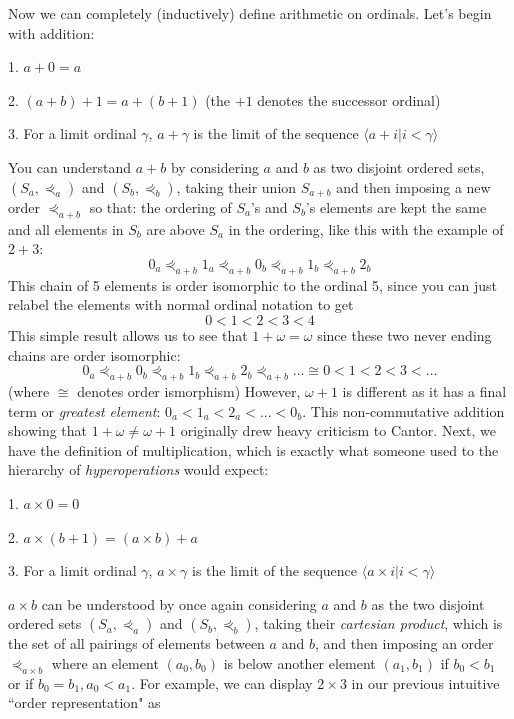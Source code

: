 Now we can completely (inductively) define arithmetic on ordinals. Let's begin with addition:

1. \(a + 0 = a\)

2. \((a+b)+1 = a+(b+1)\) (the \(+1\) denotes the successor ordinal)

3. For a limit ordinal \(\gamma\), \(a+\gamma\) is the limit of the sequence \(\langle a+i | i < \gamma \rangle\)

You can understand \(a+b\) by considering \(a\) and \(b\) as two disjoint ordered sets, \((S_a,\curlyeqprec_a)\) and \((S_b,\curlyeqprec_b)\), taking their union \(S_{a+b}\) and then imposing a new order \(\curlyeqprec_{a+b}\) so that: the ordering of \(S_a\)'s and \(S_b\)'s elements are kept the same and all elements in \(S_b\) are above \(S_a\) in the ordering, like this with the example of \(2+3\): \[ 0_a\curlyeqprec_{a+b}1_a\curlyeqprec_{a+b}0_b\curlyeqprec_{a+b}1_b\curlyeqprec_{a+b}2_b \] This chain of 5 elements is order isomorphic to the ordinal 5, since you can just relabel the elements with normal ordinal notation to get \[0<1<2<3<4\] This simple result allows us to see that \(1+\omega = \omega\) since these two never ending chains are order isomorphic: \[ 0_a\curlyeqprec_{a+b}0_b\curlyeqprec_{a+b}1_b\curlyeqprec_{a+b}2_b\curlyeqprec_{a+b}... \cong 0<1<2<3<... \] (where \(\cong\) denotes order ismorphism) However, \(\omega + 1\) is different as it has a final term or \textit{greatest element}: \( 0_a < 1_a < 2_a < ... < 0_b\). This non-commutative addition showing that \(1+\omega \neq \omega+1\) originally drew heavy criticism to Cantor. Next, we have the definition of multiplication, which is exactly what someone used to the hierarchy of \textit{hyperoperations} would expect:

1. \(a\times{}0 = 0\)

2. \(a\times{}(b+1) = (a\times{}b)+a \)

3. For a limit ordinal \(\gamma\), \(a\times{}\gamma\) is the limit of the sequence \(\langle a\times{}i | i < \gamma \rangle\)

\(a\times{}b\) can be understood by once again considering \(a\) and \(b\) as the two disjoint ordered sets \((S_a,\curlyeqprec_a)\) and \((S_b,\curlyeqprec_b)\), taking their \textit{cartesian product}, which is the set of all pairings of elements between \(a\) and \(b\), and then imposing an order \(\curlyeqprec_{a\times{}b}\) where an element \( (a_0, b_0) \) is below another element \( (a_1, b_1) \) if \( b_0 < b_1\) or if \(b_0 = b_1, a_0 < a_1\). For example, we can display \(2\times{}3\) in our previous intuitive ``order representation" as



